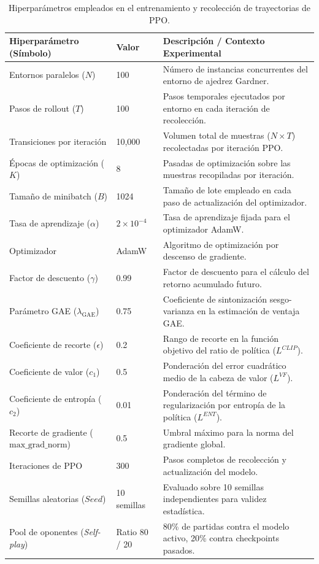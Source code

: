 \documentclass[12pt, a4paper]{article}
\begin{document}
\begin{table}[htbp]
    \centering
    \small
    \begin{tabular}{|p{5cm}|p{2.5cm}|p{8cm}|}
    \hline
    \textbf{Hiperparámetro (Símbolo)} & \textbf{Valor} & \textbf{Descripción / Contexto Experimental} \\
    \hline
    Entornos paralelos ($N$) & 100 & Número de instancias concurrentes del entorno de ajedrez Gardner. \\ \hline
    Pasos de rollout ($T$) & 100 & Pasos temporales ejecutados por entorno en cada iteración de recolección. \\ \hline
    Transiciones por iteración & 10,000 & Volumen total de muestras ($N \times T$) recolectadas por iteración PPO. \\ \hline
    Épocas de optimización ($K$) & 8 & Pasadas de optimización sobre las muestras recopiladas por iteración. \\ \hline
    Tamaño de minibatch ($B$) & 1024 & Tamaño de lote empleado en cada paso de actualización del optimizador. \\ \hline
    Tasa de aprendizaje ($\alpha$) & $2 \times 10^{-4}$ & Tasa de aprendizaje fijada para el optimizador AdamW. \\ \hline
    Optimizador & AdamW & Algoritmo de optimización por descenso de gradiente. \\ \hline
    Factor de descuento ($\gamma$) & 0.99 & Factor de descuento para el cálculo del retorno acumulado futuro. \\ \hline
    Parámetro GAE ($\lambda_{\text{GAE}}$) & 0.75 & Coeficiente de sintonización sesgo-varianza en la estimación de ventaja GAE. \\ \hline
    Coeficiente de recorte ($\epsilon$) & 0.2 & Rango de recorte en la función objetivo del ratio de política ($L^{CLIP}$). \\ \hline
    Coeficiente de valor ($c_1$) & 0.5 & Ponderación del error cuadrático medio de la cabeza de valor ($L^{VF}$). \\ \hline
    Coeficiente de entropía ($c_2$) & 0.01 & Ponderación del término de regularización por entropía de la política ($L^{ENT}$). \\ \hline
    Recorte de gradiente ($\text{max\_grad\_norm}$) & 0.5 & Umbral máximo para la norma del gradiente global. \\ \hline
    Iteraciones de PPO & 300 & Pasos completos de recolección y actualización del modelo. \\ \hline
    Semillas aleatorias ($Seed$) & 10 semillas & Evaluado sobre 10 semillas independientes para validez estadística. \\ \hline
    Pool de oponentes (\textit{Self-play}) & Ratio 80 / 20 & 80\% de partidas contra el modelo activo, 20\% contra checkpoints pasados. \\
    \hline
    \end{tabular}
    \caption[Hiperparámetros del algoritmo PPO]{Hiperparámetros empleados en el entrenamiento y recolección de trayectorias de PPO.}
    \label{tab:hiperparam_ppo}
\end{table}
\end{document}
